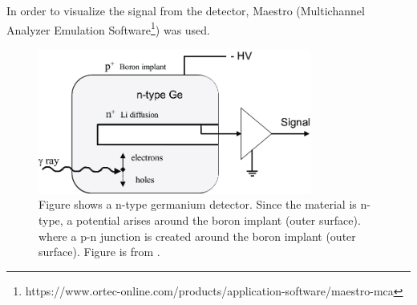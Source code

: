 \noindent
In order to visualize the signal from the detector, Maestro  (Multichannel Analyzer Emulation Software\footnote{https://www.ortec-online.com/products/application-software/maestro-mca}) was used. \\

\begin{figure}
    \centering
    \includegraphics[width=0.8\textwidth]{Experiment/n-type_Ge.png}
    \caption{Figure shows a n-type germanium detector. Since the material is n-type, a potential arises around the boron implant (outer surface). where a p-n junction is created around the boron implant (outer surface). Figure is from \cite{Lee2003}.  %
}
    \label{fig:ntype_detector}
\end{figure}

